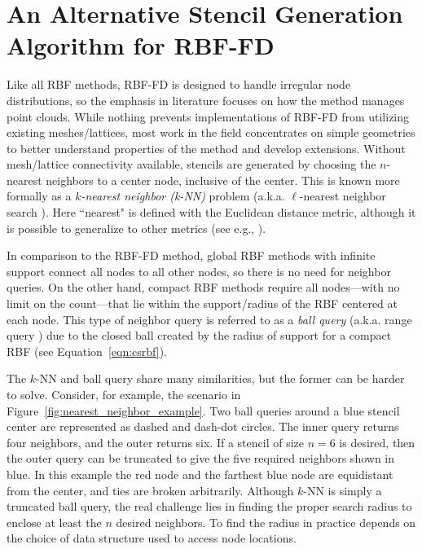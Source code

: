 \documentclass{report}
\begin{document}
\fi




\chapter{An Alternative Stencil Generation Algorithm for RBF-FD}
\label{chap:stencils}

Like all RBF methods, RBF-FD is designed to handle irregular node distributions, so the emphasis in literature focuses on how the method manages point clouds. While nothing prevents implementations of RBF-FD from utilizing existing meshes/lattices, most work in the field concentrates on simple geometries to better understand properties of the method and develop extensions. Without mesh/lattice connectivity available, stencils are generated by choosing the $n$-nearest neighbors to a center node, inclusive of the center. This is known more formally as a \emph{$k$-nearest neighbor (k-NN)} problem \cite{TagliasacchiMFE} (a.k.a. $\ell$-nearest neighbor search \cite{WendlandBook}). Here ``nearest" is defined with the Euclidean distance metric, although it is possible to generalize to other metrics (see e.g., \cite{MatlabKDTreeSearcher}). 

In comparison to the RBF-FD method, global RBF methods with infinite support connect all nodes to all other nodes, so there is no need for neighbor queries. On the other hand, compact RBF methods require all nodes---with no limit on the count---that lie within the support/radius of the RBF centered at each node. This type of neighbor query is referred to as a \emph{ball query} (a.k.a. range query \cite{WendlandBook}) due to the closed ball created by the radius of support for a compact RBF (see Equation~\ref{eqn:csrbf}). 

The $k$-NN and ball query share many similarities, but the former can be harder to solve. Consider, for example, the scenario in Figure~\ref{fig:nearest_neighbor_example}. Two ball queries around a blue stencil center are represented as dashed and dash-dot circles. The inner query returns four neighbors, and the outer returns six. If a stencil of size $n=6$ is desired, then the outer query can be truncated to give the five required neighbors shown in blue. In this example the red node and the farthest blue node are equidistant from the center, and ties are broken arbitrarily. Although $k$-NN is simply a truncated ball query, the real challenge lies in finding the proper search radius to enclose at least the $n$ desired neighbors. To find the radius in practice depends on the choice of data structure used to access node locations. 
\end{document}

